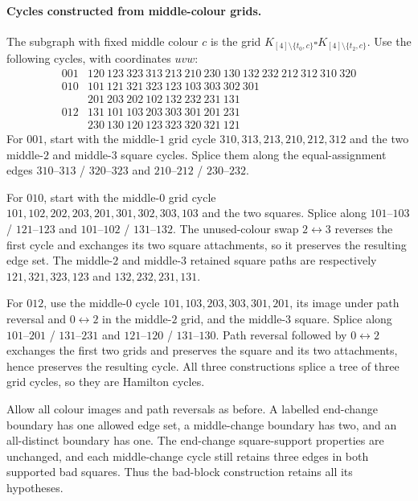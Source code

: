 \paragraph{Cycles constructed from middle-colour grids.}
The subgraph with fixed middle colour $c$ is the grid
$K_{[4]\setminus\{t_0,c\}}\square
 K_{[4]\setminus\{t_2,c\}}$.
Use the following cycles, with coordinates $uvw$:
\[
\begin{array}{c|l}
001&120\ 123\ 323\ 313\ 213\ 210\ 230\ 130\ 132\ 232\ 212\ 312\ 310\ 320\\[2pt]
010&101\ 121\ 321\ 323\ 123\ 103\ 303\ 302\ 301\\
   &201\ 203\ 202\ 102\ 132\ 232\ 231\ 131\\[2pt]
012&131\ 101\ 103\ 203\ 303\ 301\ 201\ 231\\
   &230\ 130\ 120\ 123\ 323\ 320\ 321\ 121
\end{array}
\]
For $001$, start with the middle-$1$ grid cycle
$310,313,213,210,212,312$ and the two middle-$2$ and
middle-$3$ square cycles. Splice them along the equal-assignment
edges $310$--$313$ / $320$--$323$ and
$210$--$212$ / $230$--$232$.

For $010$, start with the middle-$0$ grid cycle
$101,102,202,203,201,301,302,303,103$ and the two squares.
Splice along $101$--$103$ / $121$--$123$ and
$101$--$102$ / $131$--$132$.
The unused-colour swap $2\leftrightarrow3$ reverses the first
cycle and exchanges its two square attachments, so it preserves
the resulting edge set. The middle-$2$ and middle-$3$ retained
square paths are respectively
$121,321,323,123$ and $132,232,231,131$.

For $012$, use the middle-$0$ cycle
$101,103,203,303,301,201$, its image under path reversal and
$0\leftrightarrow2$ in the middle-$2$ grid, and the middle-$3$
square. Splice along $101$--$201$ / $131$--$231$ and
$121$--$120$ / $131$--$130$.
Path reversal followed by $0\leftrightarrow2$ exchanges the first
two grids and preserves the square and its two attachments, hence
preserves the resulting cycle. All three constructions splice a
tree of three grid cycles, so they are Hamilton cycles.

Allow all colour images and path reversals as before. A labelled
end-change boundary has one allowed edge set, a middle-change
boundary has two, and an all-distinct boundary has one.
The end-change square-support properties are unchanged, and each
middle-change cycle still retains three edges in both supported
bad squares. Thus the bad-block construction retains all its
hypotheses.

